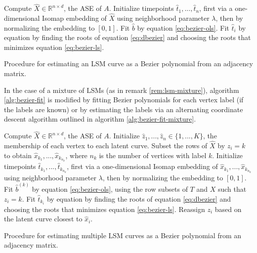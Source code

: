 \documentclass[12pt]{article}
\begin{document}
\begin{algorithm}[h]
\label{alg:bezier-fit}
\DontPrintSemicolon
\SetAlgoLined
{}
Compute $\hat{X} \in \mathbb{R}^{n \times d}$, the ASE of $A$.\;
Initialize timepoints $\hat{t}_1, ..., \hat{t}_n$, first via a one-dimensional Isomap embedding of $\hat{X}$ using neighborhood parameter $\lambda$, then by normalizing the embedding to $[0, 1]$.\;
 {
  Fit $\hat{b}$ by equation \ref{eq:bezier-ols}.\;
   {
    Fit $\hat{t}_i$ by equation by finding the roots of equation \ref{eq:dbezier} and choosing the roots that minimizes equation \ref{eq:bezier-ls}.\;
  }
}
\caption{Procedure for estimating an LSM curve as a Bezier polynomial from an adjacency matrix.}
\end{algorithm}

In the case of a mixture of LSMs (as in remark \ref{rem:lsm-mixture}),
algorithm \ref{alg:bezier-fit} is modified by fitting Bezier polynomials
for each vertex label (if the labels are known) or by estimating the
labels via an alternating coordinate descent algorithm outlined in
algorithm \ref{alg:bezier-fit-mixture}.

\begin{algorithm}[H]
\label{alg:bezier-fit-mixture}
\DontPrintSemicolon
\SetAlgoLined
{}
Compute $\hat{X} \in \mathbb{R}^{n \times d}$, the ASE of $A$.\;
Initialize $\hat{z}_1, ..., \hat{z}_n \in \{1, ..., K\}$, the membership of each vertex to each latent curve.\;
 {
  Subset the rows of $\hat{X}$ by $z_i = k$ to obtain $\hat{x}_{k_1}, ..., \hat{x}_{k_{n_k}}$, where $n_k$ is the number of vertices with label $k$.\;
  Initialize timepoints $\hat{t}_{k_1}, ..., \hat{t}_{k_{n_k}}$, first via a one-dimensional Isomap embedding of $\hat{x}_{k_1}, ..., \hat{x}_{k_{n_k}}$ using neighborhood parameter $\lambda$, then by normalizing the embedding to $[0, 1]$.\;
}
 {
   {
    Fit $\hat{b}^{(k)}$ by equation \ref{eq:bezier-ols}, using the row subsets of $T$ and $X$ such that $z_i = k$.\;
     {
      Fit $\hat{t}_{k_i}$ by equation by finding the roots of equation \ref{eq:dbezier} and choosing the roots that minimizes equation \ref{eq:bezier-ls}.\;
    }
  }
   {
    Reassign $z_i$ based on the latent curve closest to $\hat{x}_i$. 
  }
}
\caption{Procedure for estimating multiple LSM curves as a Bezier polynomial from an adjacency matrix.}
\end{algorithm}
\end{document}
